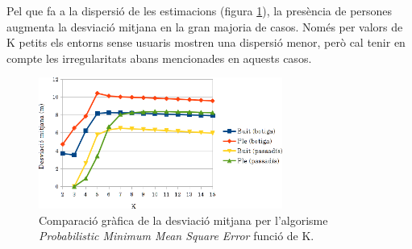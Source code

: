Pel que fa a la dispersió de les estimacions (figura \ref{fig:grafic_desviacio_MMSE}), la presència de persones augmenta la desviació mitjana en la gran majoria de casos. Només per valors de K petits els entorns sense usuaris mostren una dispersió menor, però cal tenir en compte les irregularitats abans mencionades en aquests casos. 

\begin{figure}[ht]
\begin{center}
\includegraphics[width=8cm]{imatges/mmse_desviacio.png}
\caption{Comparació gràfica de la desviació mitjana per l'algorisme \textit{Probabilistic Minimum Mean Square Error} funció de K.}
\label{fig:grafic_desviacio_MMSE}
\end{center}
\end{figure}
